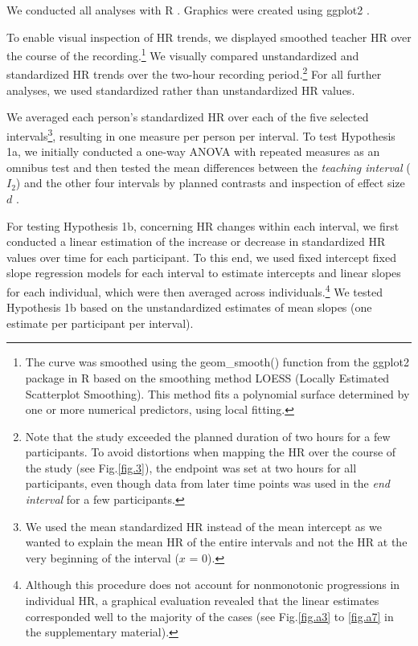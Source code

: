 \documentclass[preprint,
3p]{elsarticle} %
\begin{document}
We conducted all analyses with R \citep{RStudio2020}. Graphics were
created using ggplot2 \citep{ggplot2}.

To enable visual inspection of HR trends, we displayed smoothed teacher
HR over the course of the recording.\footnote{The curve was smoothed
  using the geom\_smooth() function from the ggplot2 package in R
  \citep{ggplot2} based on the smoothing method LOESS (Locally Estimated
  Scatterplot Smoothing). This method fits a polynomial surface
  determined by one or more numerical predictors, using local fitting.}
We visually compared unstandardized and standardized HR trends over the
two-hour recording period.\footnote{Note that the study exceeded the
  planned duration of two hours for a few participants. To avoid
  distortions when mapping the HR over the course of the study (see
  Fig.\ref{fig.3}), the endpoint was set at two hours for all
  participants, even though data from later time points was used in the
  \emph{end interval} for a few participants.} For all further analyses,
we used standardized rather than unstandardized HR values.

We averaged each person's standardized HR over each of the five selected
intervals\footnote{We used the mean standardized HR instead of the mean
  intercept as we wanted to explain the mean HR of the entire intervals
  and not the HR at the very beginning of the interval (\(x\) = 0).},
resulting in one measure per person per interval. To test Hypothesis 1a,
we initially conducted a one-way ANOVA with repeated measures as an
omnibus test and then tested the mean differences between the
\emph{teaching interval} (\(I_2\)) and the other four intervals by
planned contrasts and inspection of effect size \(d\)
\citep{cohen1988statistical}.

For testing Hypothesis 1b, concerning HR changes within each interval,
we first conducted a linear estimation of the increase or decrease in
standardized HR values over time for each participant. To this end, we
used fixed intercept fixed slope regression models
\citep{gelman2006data} for each interval to estimate intercepts and
linear slopes for each individual, which were then averaged across
individuals.\footnote{Although this procedure does not account for
  nonmonotonic progressions in individual HR, a graphical evaluation
  revealed that the linear estimates corresponded well to the majority
  of the cases (see Fig.\ref{fig.a3} to \ref{fig.a7} in the
  supplementary material).} We tested Hypothesis 1b based on the
unstandardized estimates of mean slopes (one estimate per participant
per interval).
\end{document}
